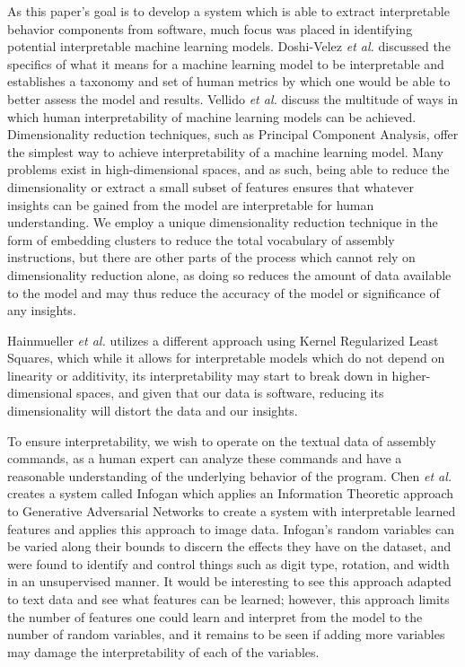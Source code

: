 As this paper's goal is to develop a system which is able to extract interpretable behavior components from software, much focus was placed in identifying potential interpretable machine learning models. Doshi-Velez \textit{et al.} \cite{doshi2017towards} discussed the specifics of what it means for a machine learning model to be interpretable and establishes a taxonomy and set of human metrics by which one would be able to better assess the model and results. Vellido \textit{et al.} \cite{vellido2012making} discuss the multitude of ways in which human interpretability of machine learning models can be achieved. Dimensionality reduction techniques, such as Principal Component Analysis, offer the simplest way to achieve interpretability of a machine learning model. Many problems exist in high-dimensional spaces, and as such, being able to reduce the dimensionality or extract a small subset of features ensures that whatever insights can be gained from the model are interpretable for human understanding. We employ a unique dimensionality reduction technique in the form of embedding clusters to reduce the total vocabulary of assembly instructions, but there are other parts of the process which cannot rely on dimensionality reduction alone, as doing so reduces the amount of data available to the model and may thus reduce the accuracy of the model or significance of any insights.

Hainmueller \textit{et al.} \cite{hainmueller2014kernel} utilizes a different approach using Kernel Regularized Least Squares, which while it allows for interpretable models which do not depend on linearity or additivity, its interpretability may start to break down in higher-dimensional spaces, and given that our data is software, reducing its dimensionality will distort the data and our insights. 

To ensure interpretability, we wish to operate on the textual data of assembly commands, as a human expert can analyze these commands and have a reasonable understanding of the underlying behavior of the program. Chen \textit{et al.} \cite{chen2016infogan} creates a system called Infogan which applies an Information Theoretic approach to Generative Adversarial Networks to create a system with interpretable learned features and applies this approach to image data. Infogan's random variables can be varied along their bounds to discern the effects they have on the dataset, and were found to identify and control things such as digit type, rotation, and width in an unsupervised manner. It would be interesting to see this approach adapted to text data and see what features can be learned; however, this approach limits the number of features one could learn and interpret from the model to the number of random variables, and it remains to be seen if adding more variables may damage the interpretability of each of the variables.